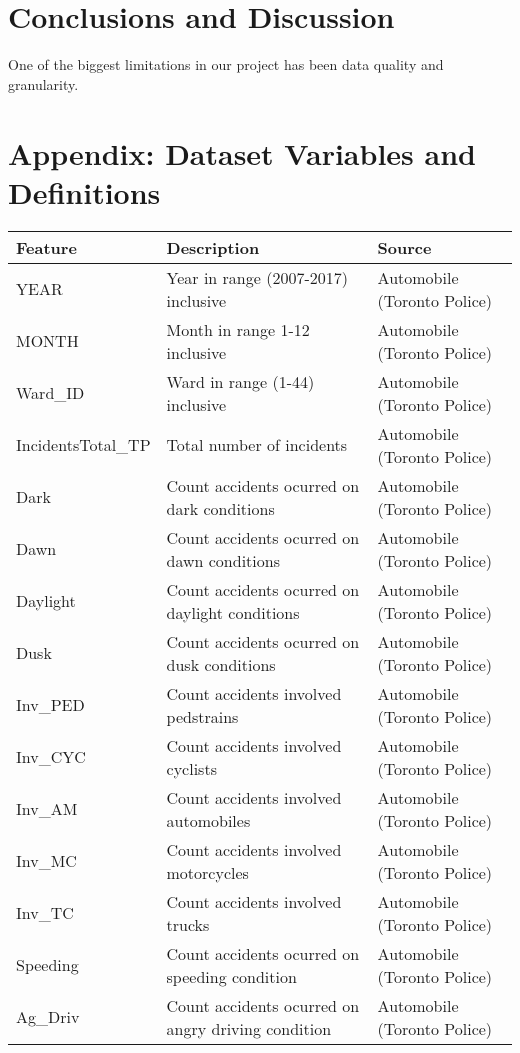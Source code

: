 \documentclass[]{article}
\begin{document}
\section{Conclusions and Discussion}\label{conclusions-and-discussion}

One of the biggest limitations in our project has been data quality and
granularity.

\section{Appendix: Dataset Variables and
Definitions}\label{appendix-dataset-variables-and-definitions}

\begin{tabular}{lll}
\toprule
Feature & Description & Source\\
\midrule
YEAR & Year in range (2007-2017) inclusive & Automobile (Toronto Police)\\
MONTH & Month in range 1-12 inclusive & Automobile (Toronto Police)\\
Ward\_ID & Ward in range (1-44) inclusive & Automobile (Toronto Police)\\
IncidentsTotal\_TP & Total number of incidents & Automobile (Toronto Police)\\
Dark & Count accidents ocurred on dark conditions & Automobile (Toronto Police)\\
Dawn & Count accidents ocurred on dawn conditions & Automobile (Toronto Police)\\
Daylight & Count accidents ocurred on daylight conditions & Automobile (Toronto Police)\\
Dusk & Count accidents ocurred on dusk conditions & Automobile (Toronto Police)\\
Inv\_PED & Count accidents involved pedstrains & Automobile (Toronto Police)\\
Inv\_CYC & Count accidents involved cyclists & Automobile (Toronto Police)\\
Inv\_AM & Count accidents involved automobiles & Automobile (Toronto Police)\\
Inv\_MC & Count accidents involved motorcycles & Automobile (Toronto Police)\\
Inv\_TC & Count accidents involved trucks & Automobile (Toronto Police)\\
Speeding & Count accidents ocurred on speeding condition & Automobile (Toronto Police)\\
Ag\_Driv & Count accidents ocurred on angry driving condition & Automobile (Toronto Police)\\

\end{tabular}
\end{document}
